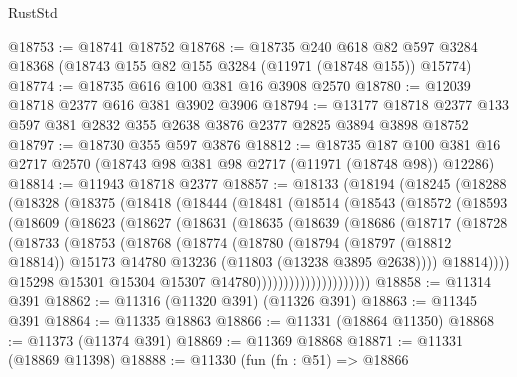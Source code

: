 \begin{lexlean}{RustStd}
\begin{coremodule}
@18753 := @18741 @18752
@18768 := @18735
    @240
    @618
    @82
    @597
    @3284
    @18368
    (@18743 @155 @82 @155 @3284 (@11971 (@18748 @155)) @15774)
@18774 := @18735 @616 @100 @381 @16 @3908 @2570
@18780 := @12039 @18718 @2377 @616 @381 @3902 @3906
@18794 := @13177 @18718 @2377 @133 @597 @381 @2832 @355 @2638 @3876 @2377 @2825 @3894 @3898 @18752
@18797 := @18730 @355 @597 @3876
@18812 := @18735
    @187
    @100
    @381
    @16
    @2717
    @2570
    (@18743 @98 @381 @98 @2717 (@11971 (@18748 @98)) @12286)
@18814 := @11943 @18718 @2377
@18857 := @18133
    (@18194
      (@18245
        (@18288
          (@18328
            (@18375
              (@18418
                (@18444
                  (@18481
                    (@18514
                      (@18543
                        (@18572
                          (@18593
                            (@18609
                              (@18623
                                (@18627
                                  (@18631
                                    (@18635
                                      (@18639
                                        (@18686
                                          (@18717
                                            (@18728
                                              (@18733
                                                (@18753
                                                  (@18768
                                                    (@18774
                                                      (@18780
                                                        (@18794
                                                          (@18797 (@18812 @18814))
                                                          @15173
                                                          @14780
                                                          @13236
                                                          (@11803 (@13238 @3895 @2638))))
                                                      @18814))))
                                              @15298
                                              @15301
                                              @15304
                                              @15307
                                              @14780)))))))))))))))))))))
@18858 := @11314 @391
@18862 := @11316 (@11320 @391) (@11326 @391)
@18863 := @11345 @391
@18864 := @11335 @18863
@18866 := @11331 (@18864 @11350)
@18868 := @11373 (@11374 @391)
@18869 := @11369 @18868
@18871 := @11331 (@18869 @11398)
@18888 := @11330
    (fun (fn : @51) =>
    @18866

\end{coremodule}
\end{lexlean}
